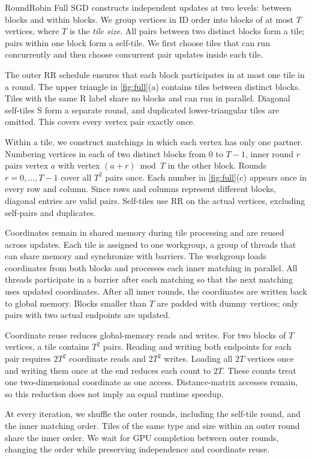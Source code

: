 RoundRobin Full SGD constructs independent updates at two levels: between blocks and within blocks.
We group vertices in ID order into blocks of at most $T$ vertices, where $T$ is the \emph{tile size}.
All pairs between two distinct blocks form a tile; pairs within one block form a self-tile.
We first choose tiles that can run concurrently and then choose concurrent pair updates inside each tile.

The outer RR schedule ensures that each block participates in at most one tile in a round.
The upper triangle in \autoref{fig:full}(a) contains tiles between distinct blocks.
Tiles with the same R label share no blocks and can run in parallel.
Diagonal self-tiles S form a separate round, and duplicated lower-triangular tiles are omitted.
This covers every vertex pair exactly once.

Within a tile, we construct matchings in which each vertex has only one partner.
Numbering vertices in each of two distinct blocks from $0$ to $T-1$, inner round $r$ pairs vertex $a$ with vertex $(a+r)\bmod T$ in the other block.
Rounds $r=0,\ldots,T-1$ cover all $T^2$ pairs once.
Each number in \autoref{fig:full}(c) appears once in every row and column.
Since rows and columns represent different blocks, diagonal entries are valid pairs.
Self-tiles use RR on the actual vertices, excluding self-pairs and duplicates.

Coordinates remain in shared memory during tile processing and are reused across updates.
Each tile is assigned to one workgroup, a group of threads that can share memory and synchronize with barriers.
The workgroup loads coordinates from both blocks and processes each inner matching in parallel.
All threads participate in a barrier after each matching so that the next matching uses updated coordinates.
After all inner rounds, the coordinates are written back to global memory.
Blocks smaller than $T$ are padded with dummy vertices; only pairs with two actual endpoints are updated.

Coordinate reuse reduces global-memory reads and writes.
For two blocks of $T$ vertices, a tile contains $T^2$ pairs.
Reading and writing both endpoints for each pair requires $2T^2$ coordinate reads and $2T^2$ writes.
Loading all $2T$ vertices once and writing them once at the end reduces each count to $2T$.
These counts treat one two-dimensional coordinate as one access.
Distance-matrix accesses remain, so this reduction does not imply an equal runtime speedup.

At every iteration, we shuffle the outer rounds, including the self-tile round, and the inner matching order.
Tiles of the same type and size within an outer round share the inner order.
We wait for GPU completion between outer rounds, changing the order while preserving independence and coordinate reuse.

